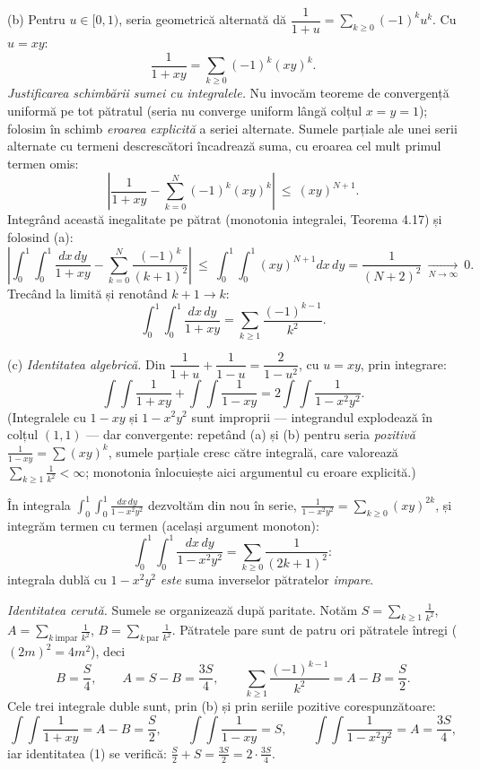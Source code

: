 (b) Pentru $u\in[0,1)$, seria geometrică alternată dă $\dfrac{1}{1+u}=\sum_{k\ge0}(-1)^{k}u^{k}$. Cu $u=xy$:
\[ \frac{1}{1+xy}=\sum_{k\ge0}(-1)^{k}(xy)^{k} . \]
\emph{Justificarea schimbării sumei cu integralele.} Nu invocăm teoreme de convergență uniformă pe tot pătratul (seria nu converge uniform lângă colțul $x=y=1$); folosim în schimb \emph{eroarea explicită} a seriei alternate. Sumele parțiale ale unei serii alternate cu termeni descrescători încadrează suma, cu eroarea cel mult primul termen omis:
\[ \left|\frac{1}{1+xy}-\sum_{k=0}^{N}(-1)^{k}(xy)^{k}\right|\ \le\ (xy)^{N+1} . \]
Integrând această inegalitate pe pătrat (monotonia integralei, Teorema 4.17) și folosind (a):
\[ \left|\int_{0}^{1}\!\!\int_{0}^{1}\frac{dx\,dy}{1+xy}-\sum_{k=0}^{N}\frac{(-1)^{k}}{(k+1)^{2}}\right|\ \le\ \int_{0}^{1}\!\!\int_{0}^{1}(xy)^{N+1}dx\,dy=\frac{1}{(N+2)^{2}}\ \xrightarrow[N\to\infty]{}\ 0 . \]
Trecând la limită și renotând $k+1\to k$:
\[ \int_{0}^{1}\!\!\int_{0}^{1}\frac{dx\,dy}{1+xy}=\sum_{k\ge1}\frac{(-1)^{k-1}}{k^{2}} . \]

(c) \emph{Identitatea algebrică.} Din $\dfrac{1}{1+u}+\dfrac{1}{1-u}=\dfrac{2}{1-u^{2}}$, cu $u=xy$, prin integrare:
\[ \int\!\!\int\frac{1}{1+xy}+\int\!\!\int\frac{1}{1-xy}=2\int\!\!\int\frac{1}{1-x^{2}y^{2}} . \tag{1} \]
(Integralele cu $1-xy$ și $1-x^{2}y^{2}$ sunt improprii --- integrandul explodează în colțul $(1,1)$ --- dar convergente: repetând (a) și (b) pentru seria \emph{pozitivă} $\frac{1}{1-xy}=\sum(xy)^{k}$, sumele parțiale cresc către integrală, care valorează $\sum_{k\ge1}\frac{1}{k^{2}}<\infty$; monotonia înlocuiește aici argumentul cu eroare explicită.)

În integrala $\displaystyle\int_{0}^{1}\!\!\int_{0}^{1}\frac{dx\,dy}{1-x^{2}y^{2}}$ dezvoltăm din nou în serie, $\frac{1}{1-x^{2}y^{2}}=\sum_{k\ge0}(xy)^{2k}$, și integrăm termen cu termen (același argument monoton):
\[ \int_{0}^{1}\!\!\int_{0}^{1}\frac{dx\,dy}{1-x^{2}y^{2}}=\sum_{k\ge0}\frac{1}{(2k+1)^{2}} : \]
integrala dublă cu $1-x^{2}y^{2}$ \emph{este} suma inverselor pătratelor \emph{impare}.

\emph{Identitatea cerută.} Sumele se organizează după paritate. Notăm $S=\sum_{k\ge1}\frac{1}{k^{2}}$, $A=\sum_{k\ \text{impar}}\frac{1}{k^{2}}$, $B=\sum_{k\ \text{par}}\frac{1}{k^{2}}$. Pătratele pare sunt de patru ori pătratele întregi ($(2m)^{2}=4m^{2}$), deci
\[ B=\frac{S}{4},\qquad A=S-B=\frac{3S}{4},\qquad \sum_{k\ge1}\frac{(-1)^{k-1}}{k^{2}}=A-B=\frac{S}{2} . \]
Cele trei integrale duble sunt, prin (b) și prin seriile pozitive corespunzătoare:
\[ \int\!\!\int\frac{1}{1+xy}=A-B=\frac S2,\qquad \int\!\!\int\frac{1}{1-xy}=S,\qquad \int\!\!\int\frac{1}{1-x^{2}y^{2}}=A=\frac{3S}{4} , \]
iar identitatea (1) se verifică: $\frac S2+S=\frac{3S}{2}=2\cdot\frac{3S}{4}$. \checkmark

